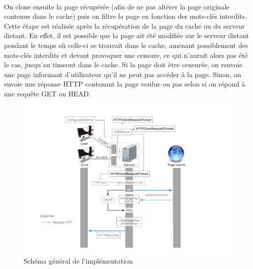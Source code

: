 \documentclass[a4paper,11pt]{article}
\begin{document}
\paragraph{}

On clone ensuite la page récupérée (afin de ne pas altérer la page originale contenue dans le cache) puis on filtre la page en fonction des mots-clés interdits. Cette étape est réalisée après la récupération de la page du cache ou du serveur distant. En effet, il est possible que la page ait été modifiée sur le serveur distant pendant le temps où celle-ci se trouvait dans le cache, amenant possiblement des mots-clés interdits et devant provoquer une censure, ce qui n'aurait alors pas été le cas, jusqu'au timeout dans le cache. Si la page doit être censurée, on renvoie une page informant d'utilisateur qu'il ne peut pas accéder à la page. Sinon, on envoie une réponse HTTP contenant la page voulue ou pas selon si on répond à une requête GET ou HEAD.

\begin{landscape}
	\begin{figure}
		\center
		\includegraphics[scale=0.85]{schema-general}
		\caption{Schéma général de l'implémentation}
		\label{fig:schema_general}
	\end{figure}
\end{landscape}
\end{document}
